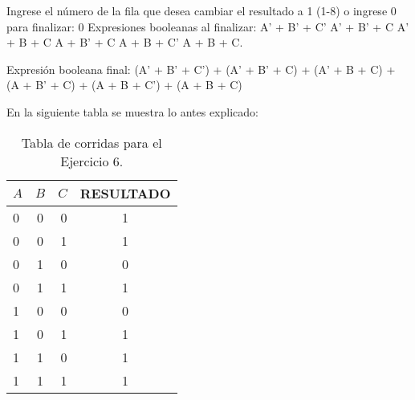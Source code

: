 Ingrese el número de la fila que desea cambiar el resultado a 1 (1-8) o ingrese 0 para finalizar: 0
Expresiones booleanas al finalizar:
A' + B' + C'
A' + B' + C
A' + B + C
A + B' + C
A + B + C'
A + B + C.

Expresión booleana final: (A' + B' + C') + (A' + B' + C) + (A' + B + C) + (A + B' + C) + (A + B + C') + (A + B + C)


En la siguiente tabla se muestra lo antes explicado:

\begin{table}[h!]
  \centering
  \caption{Tabla de corridas para el Ejercicio 6.}
  \label{tab:tabla_ejemplo}
  \begin{tabular}{|l|c|r|c|}
    \hline
    \textbf{$A$} & \textbf{$B$} & \textbf{$C$} & \textbf{RESULTADO} \\
    \hline
    0 & 0 & 0 & 1\\
    0 & 0 & 1 & 1\\
    0 & 1 & 0 & 0\\
    0 & 1 & 1 & 1\\
    1 & 0 & 0 & 0\\
    1 & 0 & 1 & 1\\
    1 & 1 & 0 & 1\\
    1 & 1 & 1 & 1\\
    
    \hline
  \end{tabular}
\end{table}
